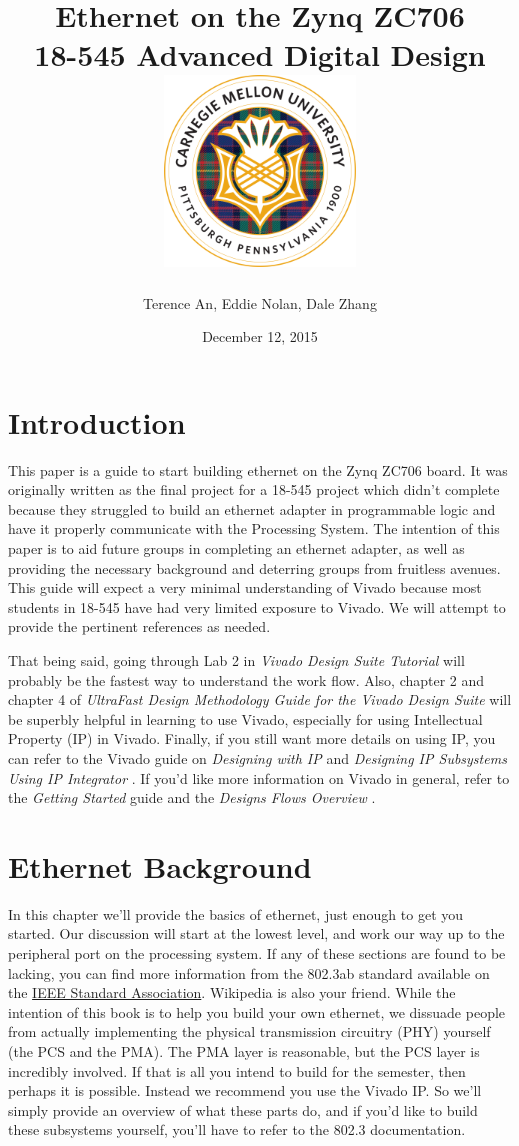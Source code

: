 \documentclass[12pt]{report}
\title{
  {Ethernet on the Zynq ZC706 \vspace{0.2in}}\\
  {\large 18-545 Advanced Digital Design \vspace{0.2in}}\\
  {\includegraphics[width=2in]{cmu_seal.png}}
}
\author{Terence An, Eddie Nolan, Dale Zhang}
\date{December 12, 2015}
\begin{document}
\maketitle

\tableofcontents

\chapter{Introduction}
This paper is a guide to start building ethernet on the Zynq ZC706 board. It was originally written as the final project for a 18-545 project which didn't complete because they struggled to build an ethernet adapter in programmable logic and have it properly communicate with the Processing System. The intention of this paper is to aid future groups in completing an ethernet adapter, as well as providing the necessary background and deterring groups from fruitless avenues. This guide will expect a very minimal understanding of Vivado because most students in 18-545 have had very limited exposure to Vivado. We will attempt to provide the pertinent references as needed.

That being said, going through Lab 2 in \textit{Vivado Design Suite Tutorial} \cite{vivado_tut} will probably be the fastest way to understand the work flow. Also, chapter 2 and chapter 4 of \textit{UltraFast Design Methodology Guide for the Vivado Design Suite} \cite{ultrafast} will be superbly helpful in learning to use Vivado, especially for using Intellectual Property (IP) in Vivado. Finally, if you still want more details on using IP, you can refer to the Vivado guide on \textit{Designing with IP} \cite{IP} and \textit{Designing IP Subsystems Using IP Integrator} \cite{IP_subsystems}. If you'd like more information on Vivado in general, refer to the \textit{Getting Started} \cite{starter} guide and the \textit{Designs Flows Overview} \cite{design_flows}.

\chapter{Ethernet Background}
In this chapter we'll provide the basics of ethernet, just enough to get you started.
Our discussion will start at the lowest level, and work our way up to the peripheral port on the processing system. If any of these sections are found to be lacking, you can find more information from the 802.3ab standard available on the \href{http://standards.ieee.org/about/get/802/802.3.html}{IEEE Standard Association}. Wikipedia is also your friend.
While the intention of this book is to help you build your own ethernet,
we dissuade people from actually implementing the physical transmission circuitry (PHY) yourself (the PCS and the PMA). The PMA layer is reasonable, but the PCS layer is incredibly involved. If that is all you intend to build for the semester, then perhaps it is possible. Instead we recommend you use the Vivado IP. So we'll simply provide an overview of what these parts do, and if you'd like to build these subsystems yourself, you'll have to refer to the 802.3 documentation.
\end{document}

